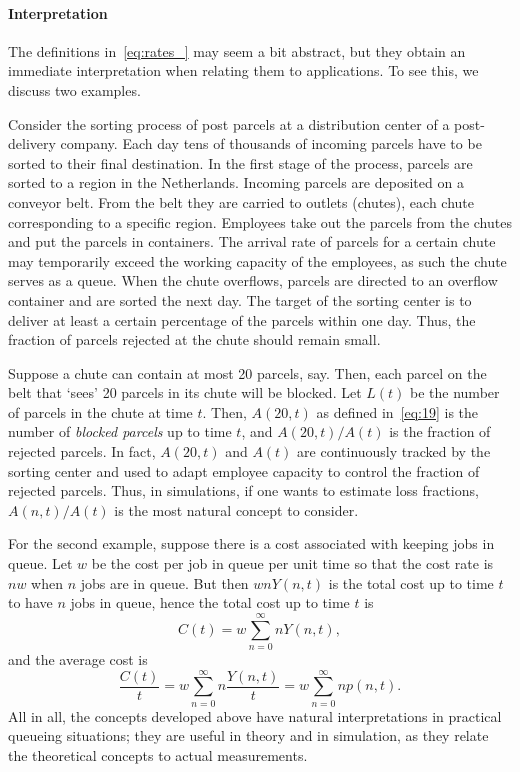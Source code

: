 \paragraph{Interpretation}

The definitions in~\cref{eq:rates_} may seem a bit abstract, but they obtain an immediate interpretation when relating them to applications.
To see this, we discuss two examples.

Consider the sorting process of post parcels at a distribution center of a post-delivery company.
Each day tens of thousands of incoming parcels have to be sorted to their final destination.
In the first stage of the process, parcels are sorted to a region in the Netherlands.
Incoming parcels are deposited on a conveyor belt.
From the belt they are carried to outlets (chutes), each chute corresponding to a specific region.
Employees take out the parcels from the chutes and put the parcels in containers.
The arrival rate of parcels for a certain chute may temporarily exceed the working capacity of the employees, as such the chute serves as a queue.
When the chute overflows, parcels are directed to an overflow container and are sorted the next day.
The target of the sorting center is to deliver at least a certain percentage of the parcels within one day.
Thus, the fraction of parcels rejected at the chute should remain small.

Suppose a chute can contain at most 20 parcels, say.
Then, each parcel on the belt that `sees' 20 parcels in its chute will be blocked.
Let $L(t)$ be the number of parcels in the chute at time $t$.
Then, $A(20,t)$ as defined in~\cref{eq:19} is the number of\emph{ blocked parcels} up to time $t$, and $A(20,t)/A(t)$ is the fraction of rejected parcels.
In fact, $A(20,t)$ and $A(t)$ are continuously tracked by the sorting center and used to adapt employee capacity to control the fraction of rejected parcels.
Thus, in simulations, if one wants to estimate loss fractions, $A(n,t)/A(t)$ is the most natural concept to consider.

For the second example, suppose there is a cost associated with keeping jobs in queue.
Let $w$ be the cost per job in queue per unit time so that the cost rate is $n w$ when $n$ jobs are in queue.
But then $ w n Y(n,t)$ is the total cost up to time $t$ to have $n$ jobs in queue, hence the total cost up to time $t$ is
 \begin{equation*}
C(t) = w \sum_{n=0}^\infty n Y(n,t),
 \end{equation*}
and the average cost is
\begin{equation*}
\frac{C(t)}t = w \sum_{n=0}^\infty n \frac{Y(n,t)}t = w \sum_{n=0}^\infty n p(n,t).
\end{equation*}
All in all, the concepts developed above have natural interpretations
in practical queueing situations; they are useful in theory and in
simulation, as they relate the theoretical concepts to actual measurements.




